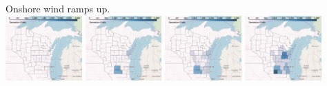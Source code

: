 \documentclass[xcolor=dvipsnames]{beamer}
\begin{document}
\begin{frame}
  Onshore wind ramps up.\\
  \includegraphics[width=0.22\textwidth]{includes/no_leakage_shutdowns_wind_r0.png}
  \includegraphics[width=0.22\textwidth]{includes/no_leakage_shutdowns_wind_r2.png}
  \includegraphics[width=0.22\textwidth]{includes/no_leakage_shutdowns_wind_r3.png}
  \includegraphics[width=0.22\textwidth]{includes/no_leakage_shutdowns_wind_r4.png}
\end{frame}
\end{document}
